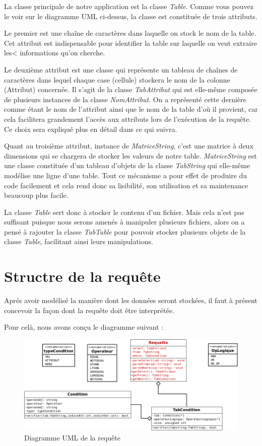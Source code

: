 \documentclass[oneside,13pt,a4paper]{report}
\begin{document}
La classe principale de notre application est la classe \textit{Table}.
Comme vous pouvez le voir sur le diagramme UML ci-dessus, la classe est constituée de trois attributs.

Le premier est une chaîne de caractères dans laquelle on stock le nom de la table. Cet attribut est indispensable pour identifier la table sur laquelle on veut extraire les< informations qu'on cherche.


Le deuxième attribut est une classe qui représente un tableau de chaînes de caractères dans lequel chaque case (cellule) stockera le nom de la colonne (Attribut) concernée. Il s'agit de la classe \textit{TabAttribut} qui est elle-même composée de plusieurs instances de la classe \textit{NomAttribut}.
On a représenté cette dernière comme étant le nom de l'attribut ainsi que le nom de la table d'où il provient, car cela facilitera grandement l'accès aux attributs lors de l'exécution de la requête. Ce choix sera expliqué plus en détail dans ce qui suivra.

Quant au troisième attribut, instance de \textit{MatriceString}, c'est une matrice à deux dimensions qui se chargera de stocker les valeurs de notre table.
\textit{MatriceString} est une classe constituée d'un tableau d'objets de la classe \textit{TabString} qui elle-même modélise une ligne d'une table. Tout ce mécanisme a pour effet de produire du code facilement et cela rend donc sa lisibilité, son utilisation et sa maintenance beaucoup plus facile.

La classe \textit{Table} sert donc à stocker le contenu d'un fichier. Mais cela n'est pas suffisant puisque nous serons amenés à manipuler plusieurs fichiers, alors on a pensé à rajouter la classe \textit{TabTable} pour pouvoir stocker plusieurs objets de la classe \textit{Table}, facilitant ainsi leurs manipulations.

\section{Structre de la requête}
\label{requete}
Aprés avoir modélisé la manière dont les données seront stockées, il faut à présent concevoir la façon dont la requête doit être interprétée.

Pour celà, nous avons conçu le diagramme suivant :

\vfill

\begin{figure}[!h]
	\centering
	\includegraphics[width=1\textwidth]{img/requette.png}
	\vspace{0.1cm}
	\caption{Diagramme UML de la requête}
\end{figure}
\end{document}
